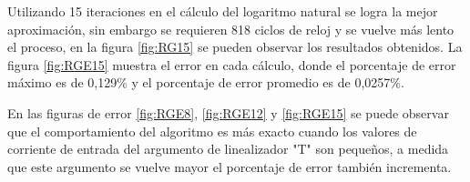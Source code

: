 Utilizando 15 iteraciones en el cálculo del logaritmo natural se logra la mejor aproximación, sin embargo se requieren 818 ciclos de reloj y se vuelve más lento el proceso, en la figura \ref{fig:RG15} se pueden observar los resultados obtenidos. La figura \ref{fig:RGE15} muestra el error en cada cálculo, donde el porcentaje de error máximo es de  0,129\% y el porcentaje de error promedio es de 0,0257\%. 


En las figuras de error \ref{fig:RGE8}, \ref{fig:RGE12} y \ref{fig:RGE15} se puede observar que el comportamiento del algoritmo es más exacto cuando los valores de corriente de entrada del argumento de linealizador "T" son pequeños, a medida que este argumento se vuelve mayor el porcentaje de error también incrementa. 